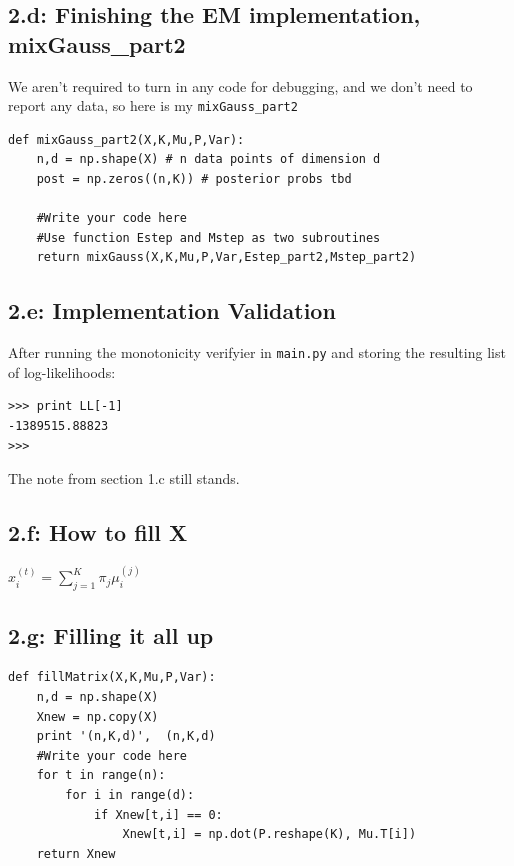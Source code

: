 \documentclass{article}
\begin{document}
\subsection*{2.d: Finishing the EM implementation, mixGauss\_part2}
We aren't required to turn in any code for debugging, and we don't need to report any data, so here is my \texttt{mixGauss\_part2} 
\begin{lstlisting}
def mixGauss_part2(X,K,Mu,P,Var):
    n,d = np.shape(X) # n data points of dimension d
    post = np.zeros((n,K)) # posterior probs tbd
    
    #Write your code here
    #Use function Estep and Mstep as two subroutines
    return mixGauss(X,K,Mu,P,Var,Estep_part2,Mstep_part2)
\end{lstlisting}
\subsection*{2.e: Implementation Validation}
After running the monotonicity verifyier in \texttt{main.py} and storing the resulting list of log-likelihoods:
\begin{verbatim}
>>> print LL[-1]
-1389515.88823
>>> 
\end{verbatim}
The note from section 1.c still stands.
\subsection*{2.f: How to fill X}
\begin{center}$x_i^{(t)} = \sum_{j=1}^K \pi_j \mu_i^{(j)}$\end{center}

\subsection*{2.g: Filling it all up}
\begin{lstlisting}
def fillMatrix(X,K,Mu,P,Var):
    n,d = np.shape(X)
    Xnew = np.copy(X)
    print '(n,K,d)',  (n,K,d)
    #Write your code here
    for t in range(n):
        for i in range(d):
            if Xnew[t,i] == 0:
                Xnew[t,i] = np.dot(P.reshape(K), Mu.T[i])        
    return Xnew
\end{lstlisting}
\end{document}
